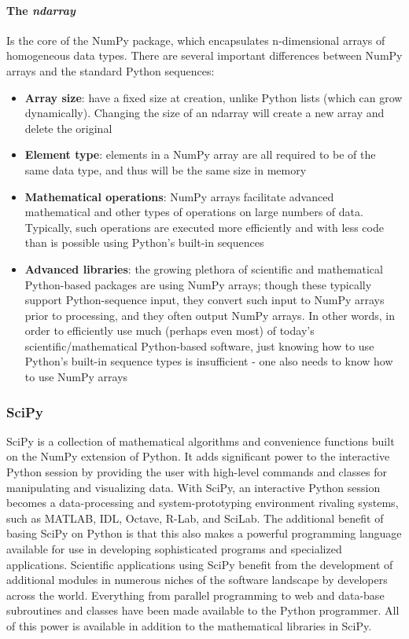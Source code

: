 \documentclass[\main/main.tex]{subfiles}
\begin{document}
\paragraph{The \emph{ndarray}} Is the core of the NumPy package, which encapsulates n-dimensional arrays of homogeneous data types. There are several important differences between NumPy arrays and the standard Python sequences:
\begin{itemize}
    \item \textbf{Array size}: have a fixed size at creation, unlike Python lists (which can grow dynamically). Changing the size of an ndarray will create a new array and delete the original
    \item \textbf{Element type}: elements in a NumPy array are all required to be of the same data type, and thus will be the same size in memory
    \item \textbf{Mathematical operations}: NumPy arrays facilitate advanced mathematical and other types of operations on large numbers of data. Typically, such operations are executed more efficiently and with less code than is possible using Python’s built-in sequences
    \item \textbf{Advanced libraries}: the growing plethora of scientific and mathematical Python-based packages are using NumPy arrays; though these typically support Python-sequence input, they convert such input to NumPy arrays prior to processing, and they often output NumPy arrays. In other words, in order to efficiently use much (perhaps even most) of today’s scientific/mathematical Python-based software, just knowing how to use Python’s built-in sequence types is insufficient - one also needs to know how to use NumPy arrays
\end{itemize}
\subsubsection{SciPy}
SciPy is a collection of mathematical algorithms and convenience functions built on the NumPy extension of Python. It adds significant power to the interactive Python session by providing the user with high-level commands and classes for manipulating and visualizing data. With SciPy, an interactive Python session becomes a data-processing and system-prototyping environment rivaling systems, such as MATLAB, IDL, Octave, R-Lab, and SciLab.
The additional benefit of basing SciPy on Python is that this also makes a powerful programming language available for use in developing sophisticated programs and specialized applications. Scientific applications using SciPy benefit from the development of additional modules in numerous niches of the software landscape by developers across the world. Everything from parallel programming to web and data-base subroutines and classes have been made available to the Python programmer. All of this power is available in addition to the mathematical libraries in SciPy\cite{2020SciPyNMeth}.
\end{document}
